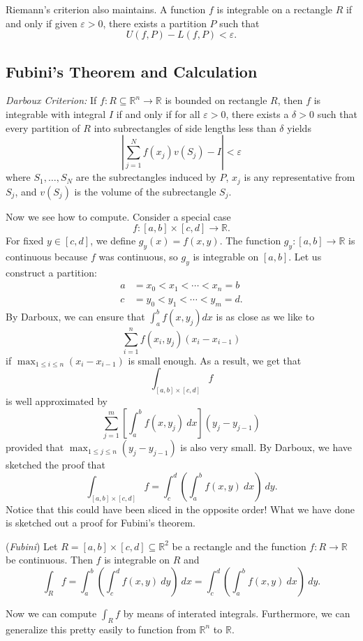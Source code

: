 \documentclass[11pt]{article}
\theoremstyle{definition}
\newcommand{\R}{\mathbb{R}}                      %
\begin{document}
Riemann's criterion also maintains. A function $f$ is integrable on a rectangle $R$ if and only if given $\varepsilon>0$, there exists a partition $P$ such that 
$$
U(f,P)-L(f,P)<\varepsilon.
$$
\subsection{Fubini's Theorem and Calculation}
\begin{shaded}
\textit{Darboux Criterion:} If $f:R\subseteq\R^n\to \R$ is bounded on rectangle $R$, then $f$ is integrable with integral $I$ if and only if for all $\varepsilon>0$, there exists a $\delta>0$ such that every partition of $R$ into subrectangles of side lengths less than $\delta$ yields 
$$
\left| \sum_{j=1}^N f(x_j)v(S_j) - I \right|<\varepsilon
$$
where $S_1,\dots,S_N$ are the subrectangles induced by $P$, $x_j$ is any representative from $S_j$, and $v(S_j)$ is the volume of the subrectangle $S_j$.
\end{shaded}

Now we see how to compute. Consider a special case
$$
f:[a,b]\times[c,d]\to \R.
$$
For fixed $y\in[c,d]$, we define $g_y(x)=f(x,y)$. The function $g_y:[a,b]\to \R$ is continuous because $f$ was continuous, so $g_y$ is integrable on $[a,b]$. Let us construct a partition:
$$
\begin{aligned}
    a&=x_0<x_1<\cdots<x_n=b\\
    c&=y_0<y_1<\cdots<y_m=d.
\end{aligned}
$$
By Darboux, we can ensure that $\int_a^b f(x,y_j)dx$ is as close as we like to 
$$
\sum_{i=1}^n f(x_i,y_j)(x_i-x_{i-1})
$$
if $\max_{1\leq i\leq n}(x_i-x_{i-1})$ is small enough. As a result, we get that
$$
\int_{[a,b]\times[c,d]} f
$$
is well approximated by
$$
\sum_{j=1}^m\left[\int_a^b f(x,y_j)~dx\right](y_j-y_{j-1})
$$
provided that $\max_{1\leq j\leq n}(y_j-y_{j-1})$ is also very small. By Darboux, we have sketched the proof that
$$
\int_{[a,b]\times[c,d]} f =\int_c^d\left(\int_a^b f(x,y)~dx\right)~dy.
$$
Notice that this could have been sliced in the opposite order! What we have done is sketched out a proof for Fubini's theorem.
 
\begin{shaded}
    \theorem (\textit{Fubini}) Let $R=[a,b]\times [c,d]\subseteq \R^2$ be a rectangle and the function $f:R\to \R$ be continuous. Then $f$ is integrable on $R$ and 
    $$
    \int_R f=\int_a^b\left(\int_c^d f(x,y)~dy\right)~dx=\int_c^d\left(\int_a^b f(x,y)~dx\right)~dy.
    $$
\end{shaded}
\note Now we can compute $\int_R f$ by means of interated integrals. Furthermore, we can generalize this pretty easily to function from $\R^n$ to $\R$. 
\end{document}
